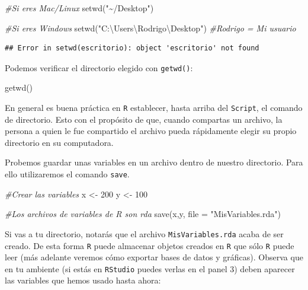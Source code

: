 \documentclass[]{tufte-book}
\newenvironment{Shaded}{}{}
\newcommand{\AttributeTok}[1]{\textcolor[rgb]{0.49,0.56,0.16}{#1}}
\newcommand{\CommentTok}[1]{\textcolor[rgb]{0.38,0.63,0.69}{\textit{#1}}}
\newcommand{\DecValTok}[1]{\textcolor[rgb]{0.25,0.63,0.44}{#1}}
\newcommand{\FunctionTok}[1]{\textcolor[rgb]{0.02,0.16,0.49}{#1}}
\newcommand{\NormalTok}[1]{#1}
\newcommand{\OtherTok}[1]{\textcolor[rgb]{0.00,0.44,0.13}{#1}}
\newcommand{\StringTok}[1]{\textcolor[rgb]{0.25,0.44,0.63}{#1}}
\begin{document}
\begin{Shaded}
\begin{Highlighting}[]
\CommentTok{\#Si eres Mac/Linux}
\FunctionTok{setwd}\NormalTok{(}\StringTok{"\textasciitilde{}/Desktop"}\NormalTok{) }

\CommentTok{\#Si eres Windows}
\FunctionTok{setwd}\NormalTok{(}\StringTok{"C:\textbackslash{}Users\textbackslash{}Rodrigo\textbackslash{}Desktop"}\NormalTok{) }\CommentTok{\#Rodrigo = Mi usuario}
\end{Highlighting}
\end{Shaded}

\begin{verbatim}
## Error in setwd(escritorio): object 'escritorio' not found
\end{verbatim}

Podemos verificar el directorio elegido con \texttt{getwd()}:

\begin{Shaded}
\begin{Highlighting}[]
\FunctionTok{getwd}\NormalTok{()}
\end{Highlighting}
\end{Shaded}

\begin{marginfigure}
En general es buena práctica en \texttt{R} establecer, hasta arriba del
\texttt{Script}, el comando de directorio. Esto con el propósito de que,
cuando compartas un archivo, la persona a quien le fue compartido el
archivo pueda rápidamente elegir su propio directorio en su computadora.
\end{marginfigure}

Probemos guardar unas variables en un archivo dentro de nuestro
directorio. Para ello utilizaremos el comando \texttt{save}.

\begin{Shaded}
\begin{Highlighting}[]
\CommentTok{\#Crear las variables}
\NormalTok{x }\OtherTok{\textless{}{-}} \DecValTok{200}
\NormalTok{y }\OtherTok{\textless{}{-}} \DecValTok{100}

\CommentTok{\#Los archivos de variables de R son rda}
\FunctionTok{save}\NormalTok{(x,y, }\AttributeTok{file =} \StringTok{"MisVariables.rda"}\NormalTok{)}
\end{Highlighting}
\end{Shaded}

Si vas a tu directorio, notarás que el archivo \texttt{MisVariables.rda}
acaba de ser creado. De esta forma \texttt{R} puede almacenar objetos
creados en \texttt{R} que sólo \texttt{R} puede leer (más adelante
veremos cómo exportar bases de datos y gráficas). Observa que en tu
ambiente (si estás en \texttt{RStudio} puedes verlas en el panel 3)
deben aparecer las variables que hemos usado hasta ahora:
\end{document}
